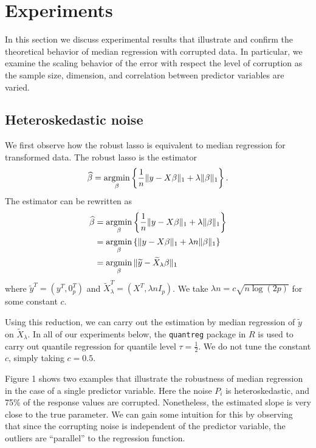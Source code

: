 
\section{Experiments}
\label{sec:experiments}

In this section we discuss experimental results that illustrate and confirm the theoretical behavior of
median regression with corrupted data. In particular, we examine the scaling behavior of the error
with respect the level of corruption as the sample size, dimension, and correlation between predictor variables
are varied.



\subsection{Heteroskedastic noise}

We first observe how the robust lasso is equivalent to median regression for transformed data. The robust lasso is the  estimator
\begin{align*}
  \hat\beta = \argmin_\beta \left\{ \frac{1}{n}\|y - X\beta\|_1 + \lambda \|\beta\|_1\right\}.
\end{align*}
The estimator can be rewritten as
\begin{align*}
  \hat\beta &= \argmin_\beta \left\{ \frac{1}{n}\|y - X\beta\|_1 + \lambda \|\beta\|_1 \right\} \\
  &= \argmin_\beta \left\{ \|y - X\beta\|_1 + \lambda n \|\beta\|_1 \right\} \\
  &= \argmin_\beta \|\tilde y - \tilde X_\lambda \beta\|_1
\end{align*}
where $\tilde y^T = (y^T, 0_p^T)$  and $\tilde X_\lambda^T = (X^T, \lambda n I_p)$.
We take $\lambda n = c\sqrt{n \log (2p)}$ for some constant $c$.

Using this reduction, we can carry out the estimation by
median regression of $\tilde y$ on $\tilde X_\lambda$. In all of our experiments below, the \texttt{quantreg} package in $R$ is used to carry out quantile regression for quantile level $\tau = \frac{1}{2}$. We do not tune the constant $c$, simply taking $c=0.5$.

Figure 1 shows two examples that illustrate the robustness of median regression
in the case of a single predictor variable. Here the noise $P_i$ is heteroskedastic, and 75\% of the response values are corrupted. Nonetheless, the estimated slope is very close to the true parameter. We can gain some intuition for this by observing that since the corrupting noise is independent of the predictor variable, the outliers are ``parallel'' to the regression function. 

